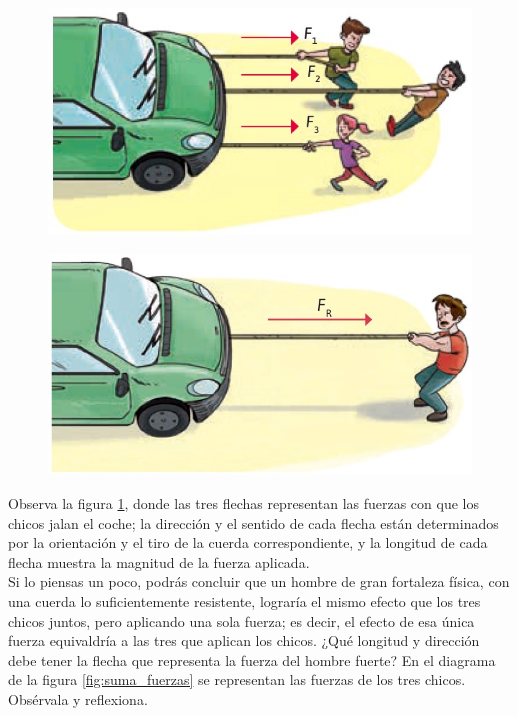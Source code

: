 \documentclass[11pt]{book}
\begin{document}
\begin{minipage}[t]{0.45\textwidth}
  \begin{figure}[H]
    \centering
    \includegraphics[width=0.8\linewidth]{jalando_carro.jpg}
    \label{fig:jalando_carro}
  \end{figure}
\end{minipage}\hfill
\begin{minipage}[t]{0.45\textwidth}
  \begin{figure}[H]
    \centering
    \includegraphics[width=0.8\linewidth]{jalando_carro2.jpg}
    \label{fig:jalando_carro2}
  \end{figure}%
\end{minipage}


Observa la figura \ref{fig:jalando_carro}, donde las tres flechas representan las fuerzas con que
los chicos
jalan el coche; la dirección y el sentido de cada flecha están determinados por la orientación
y el tiro de la cuerda correspondiente, y la longitud de cada flecha muestra la magnitud de la
fuerza aplicada.\\

Si lo piensas un poco, podrás concluir que un hombre de gran fortaleza física, con una cuerda
lo suficientemente resistente, lograría el mismo efecto que los tres chicos juntos, pero aplicando
una sola fuerza; es decir, el efecto de esa única fuerza equivaldría a las tres que aplican los
chicos. ¿Qué longitud y dirección debe tener la flecha que representa la fuerza del hombre fuerte? En el
diagrama de la figura \ref{fig:suma_fuerzas} se representan las fuerzas de los tres chicos. Obsérvala y reflexiona.\\
\end{document}
